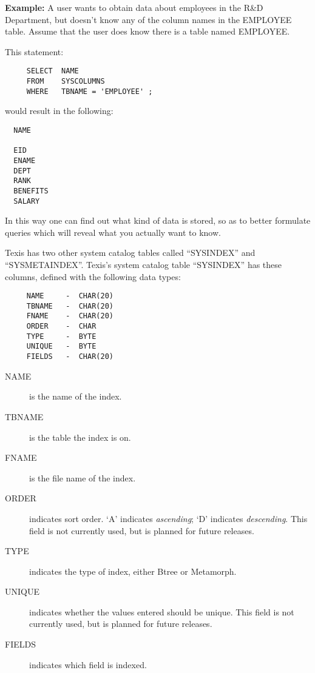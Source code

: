 {\bf Example:}
A user wants to obtain data about employees in the R\&D Department,
but doesn't know any of the column names in the EMPLOYEE table.
Assume that the user does know there is a table named EMPLOYEE.

This statement:
\begin{verbatim}
     SELECT  NAME
     FROM    SYSCOLUMNS
     WHERE   TBNAME = 'EMPLOYEE' ;
\end{verbatim}

would result in the following:

\begin{screen}
\begin{verbatim}
  NAME

  EID
  ENAME
  DEPT
  RANK
  BENEFITS
  SALARY
\end{verbatim}
\end{screen}

In this way one can find out what kind of data is stored, so as to
better formulate queries which will reveal what you actually want to
know.

Texis has two other system catalog tables called ``SYSINDEX'' and
``SYSMETAINDEX''.  Texis's system catalog table ``SYSINDEX'' has these
columns, defined with the following data types:

\begin{verbatim}
     NAME     -  CHAR(20)
     TBNAME   -  CHAR(20)
     FNAME    -  CHAR(20)
     ORDER    -  CHAR
     TYPE     -  BYTE
     UNIQUE   -  BYTE
     FIELDS   -  CHAR(20)
\end{verbatim}

\begin{description}
\item[NAME] is the name of the index.

\item[TBNAME] is the table the index is on.

\item[FNAME] is the file name of the index.

\item[ORDER] indicates sort order.  `A' indicates {\em ascending}; `D'
indicates {\em descending}.  This field is not currently used, but is
planned for future releases.

\item[TYPE] indicates the type of index, either Btree or Metamorph.

\item[UNIQUE] indicates whether the values entered should be unique.
This field is not currently used, but is planned for future releases.

\item[FIELDS] indicates which field is indexed.
\end{description}

